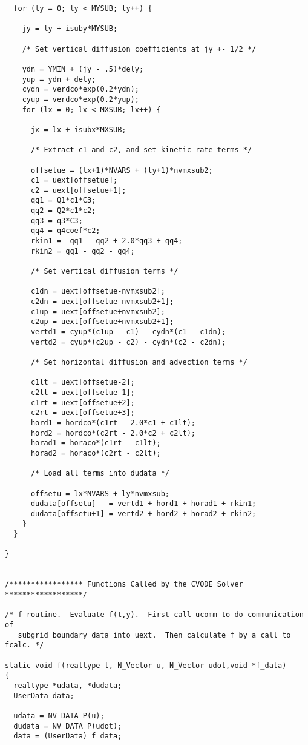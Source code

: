 \begin{verbatim}
  for (ly = 0; ly < MYSUB; ly++) {

    jy = ly + isuby*MYSUB;

    /* Set vertical diffusion coefficients at jy +- 1/2 */

    ydn = YMIN + (jy - .5)*dely;
    yup = ydn + dely;
    cydn = verdco*exp(0.2*ydn);
    cyup = verdco*exp(0.2*yup);
    for (lx = 0; lx < MXSUB; lx++) {

      jx = lx + isubx*MXSUB;

      /* Extract c1 and c2, and set kinetic rate terms */

      offsetue = (lx+1)*NVARS + (ly+1)*nvmxsub2;
      c1 = uext[offsetue];
      c2 = uext[offsetue+1];
      qq1 = Q1*c1*C3;
      qq2 = Q2*c1*c2;
      qq3 = q3*C3;
      qq4 = q4coef*c2;
      rkin1 = -qq1 - qq2 + 2.0*qq3 + qq4;
      rkin2 = qq1 - qq2 - qq4;

      /* Set vertical diffusion terms */

      c1dn = uext[offsetue-nvmxsub2];
      c2dn = uext[offsetue-nvmxsub2+1];
      c1up = uext[offsetue+nvmxsub2];
      c2up = uext[offsetue+nvmxsub2+1];
      vertd1 = cyup*(c1up - c1) - cydn*(c1 - c1dn);
      vertd2 = cyup*(c2up - c2) - cydn*(c2 - c2dn);

      /* Set horizontal diffusion and advection terms */

      c1lt = uext[offsetue-2];
      c2lt = uext[offsetue-1];
      c1rt = uext[offsetue+2];
      c2rt = uext[offsetue+3];
      hord1 = hordco*(c1rt - 2.0*c1 + c1lt);
      hord2 = hordco*(c2rt - 2.0*c2 + c2lt);
      horad1 = horaco*(c1rt - c1lt);
      horad2 = horaco*(c2rt - c2lt);

      /* Load all terms into dudata */

      offsetu = lx*NVARS + ly*nvmxsub;
      dudata[offsetu]   = vertd1 + hord1 + horad1 + rkin1; 
      dudata[offsetu+1] = vertd2 + hord2 + horad2 + rkin2;
    }
  }

}


/***************** Functions Called by the CVODE Solver ******************/

/* f routine.  Evaluate f(t,y).  First call ucomm to do communication of 
   subgrid boundary data into uext.  Then calculate f by a call to fcalc. */

static void f(realtype t, N_Vector u, N_Vector udot,void *f_data)
{
  realtype *udata, *dudata;
  UserData data;

  udata = NV_DATA_P(u);
  dudata = NV_DATA_P(udot);
  data = (UserData) f_data;



\end{verbatim}
